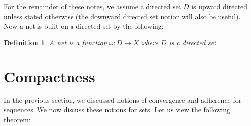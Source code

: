 \documentclass[10pt,letterpaper]{article} %
\newtheorem{defn}{Definition}[section]
\begin{document}
For the remainder of these notes, we assume a directed set $D$ is upward directed unless stated otherwise (the downward directed set notion will also be useful). Now a net is built on a directed set by the following:
\begin{defn}
A net is a function $\omega: D \xrightarrow{} X$ where $D$ is a directed set.  
\end{defn}


\pagebreak
\section{Compactness}
In the previous section, we discussed notions of convergence and adherence for sequences. We now discuss these notions for sets. Let us view the following theorem:
\end{document}
